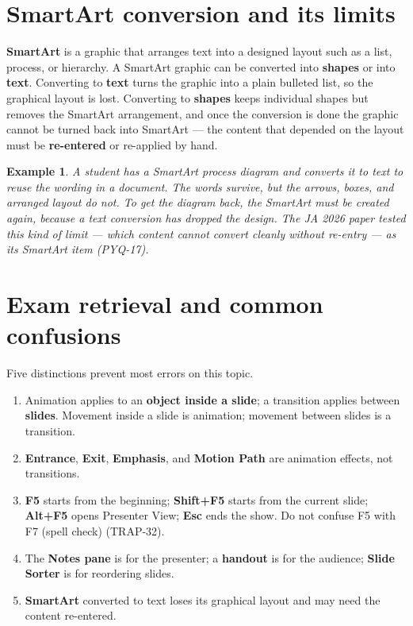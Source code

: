 \documentclass[11pt]{article}
\newtheorem{example}{Example}[section]
\begin{document}
\section{SmartArt conversion and its limits}
\textbf{SmartArt} is a graphic that arranges text into a designed layout such
as a list, process, or hierarchy. A SmartArt graphic can be converted into
\textbf{shapes} or into \textbf{text}. Converting to \textbf{text} turns the
graphic into a plain bulleted list, so the graphical layout is lost. Converting
to \textbf{shapes} keeps individual shapes but removes the SmartArt
arrangement, and once the conversion is done the graphic cannot be turned back
into SmartArt --- the content that depended on the layout must be
\textbf{re-entered} or re-applied by hand.

\begin{example}
A student has a SmartArt process diagram and converts it to text to reuse the
wording in a document. The words survive, but the arrows, boxes, and arranged
layout do not. To get the diagram back, the SmartArt must be created again,
because a text conversion has dropped the design. The JA 2026 paper tested this
kind of limit --- which content cannot convert cleanly without re-entry --- as
its SmartArt item (PYQ-17).
\end{example}

\section{Exam retrieval and common confusions}
Five distinctions prevent most errors on this topic.
\begin{enumerate}
  \item Animation applies to an \textbf{object inside a slide}; a transition
    applies between \textbf{slides}. Movement inside a slide is animation;
    movement between slides is a transition.
  \item \textbf{Entrance}, \textbf{Exit}, \textbf{Emphasis}, and
    \textbf{Motion Path} are animation effects, not transitions.
  \item \textbf{F5} starts from the beginning; \textbf{Shift+F5} starts from
    the current slide; \textbf{Alt+F5} opens Presenter View; \textbf{Esc} ends
    the show. Do not confuse F5 with F7 (spell check) (TRAP-32).
  \item The \textbf{Notes pane} is for the presenter; a \textbf{handout} is for
    the audience; \textbf{Slide Sorter} is for reordering slides.
  \item \textbf{SmartArt} converted to text loses its graphical layout and may
    need the content re-entered.
\end{enumerate}
\end{document}
